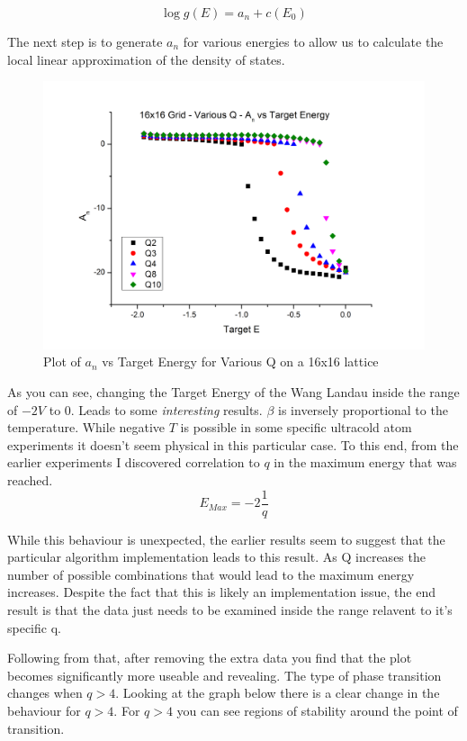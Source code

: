 \documentclass[10pt,a4paper]{article}
\begin{document}
\begin{equation}
\log{g(E)} = a_{n}+c(E_0)
\end{equation}

The next step is to generate $a_n$ for various energies to allow us to calculate the local linear approximation of the density of states.

\begin{figure}
  \centering
  \includegraphics[width=\textwidth]{variousq16x16-full.png}
  \caption{Plot of $a_n$ vs Target Energy for Various Q on a 16x16 lattice}
\end{figure}

As you can see, changing the Target Energy of the Wang Landau inside the range of $-2 V$ to $0$.
Leads to some \textit{interesting} results. $\beta$ is inversely proportional to the temperature.
While negative $T$ is possible in some specific ultracold atom experiments it doesn't seem physical in this particular case.
To this end, from the earlier experiments I discovered correlation to $q$ in the maximum energy that was reached.
\begin{equation}
    E_{Max} = -2 \frac{1}{q}
\end{equation}

While this behaviour is unexpected, the earlier results seem to suggest that the particular algorithm implementation leads to this result.
As Q increases the number of possible combinations that would lead to the maximum energy increases.
Despite the fact that this is likely an implementation issue, the end result is that the data just needs to be examined inside the range relavent to it's specific q.

Following from that, after removing the extra data you find that the plot becomes significantly more useable and revealing.
The type of phase transition changes when $q>4$.
Looking at the graph below there is a clear change in the behaviour for $q>4$.
For $q>4$ you can see regions of stability around the point of transition.
\end{document}

